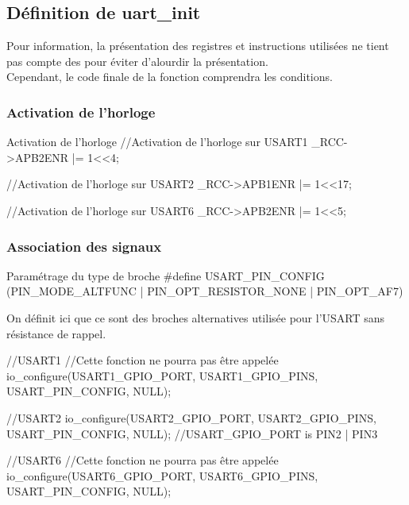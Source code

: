 \subsection{Définition de uart\_init}

Pour information, la présentation des registres et instructions utilisées ne tient pas compte des  pour éviter d'alourdir la présentation.\\
Cependant, le code finale de la fonction  comprendra les conditions.


\subsubsection{Activation de l'horloge}

\begin{Cpp}{Activation de l'horloge} 
//Activation de l'horloge sur USART1
_RCC->APB2ENR |= 1<<4;

//Activation de l'horloge sur USART2
_RCC->APB1ENR |= 1<<17;

//Activation de l'horloge sur USART6
_RCC->APB2ENR |= 1<<5;
\end{Cpp}




\subsubsection{Association des signaux}

\begin{Cpp}{Paramétrage du type de broche} 
#define USART_PIN_CONFIG (PIN_MODE_ALTFUNC | PIN_OPT_RESISTOR_NONE | PIN_OPT_AF7)
\end{Cpp}



On définit ici que ce sont des broches alternatives utilisée pour l'USART sans résistance de rappel.
\begin{Cpp}{} 
//USART1
//Cette fonction ne pourra pas être appelée
io_configure(USART1_GPIO_PORT, USART1_GPIO_PINS, USART_PIN_CONFIG, NULL);

//USART2
io_configure(USART2_GPIO_PORT, USART2_GPIO_PINS, USART_PIN_CONFIG, NULL);
//USART_GPIO_PORT is PIN2 | PIN3

//USART6
//Cette fonction ne pourra pas être appelée
io_configure(USART6_GPIO_PORT, USART6_GPIO_PINS, USART_PIN_CONFIG, NULL);
\end{Cpp}


